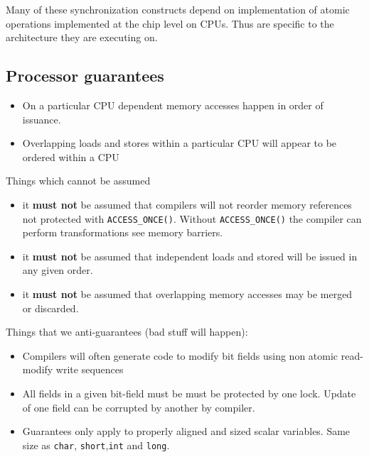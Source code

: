 \documentclass{article}
\begin{document}
Many of these synchronization constructs depend on implementation of
atomic operations implemented at the chip level on CPUs. Thus are
specific to the architecture they are executing on.

\subsection{Processor guarantees}

\begin{itemize}
  \item On a particular CPU dependent memory accesses happen in order
    of issuance.

  \item Overlapping loads and stores within a particular CPU will
    appear to be ordered within a CPU
    
\end{itemize}

Things which cannot be assumed

\begin{itemize}
\item it \textbf{must not} be assumed that compilers will not reorder
  memory references not protected with \lstinline{ACCESS_ONCE()}. Without
  \lstinline{ACCESS_ONCE()} the compiler can perform transformations see memory
  barriers.
\item it \textbf{must not} be assumed that independent loads and
  stored will be issued in any given order.
\item it \textbf{must not} be assumed that overlapping memory accesses
  may be merged or discarded.  
\end{itemize}

Things that we anti-guarantees (bad stuff will happen):

\begin{itemize}

\item Compilers will often generate code to modify bit fields using non
  atomic read-modify write sequences

\item All fields in a given bit-field must be must be protected by one
  lock. Update of one field can be corrupted by another by compiler.
  
\item Guarantees only apply to properly aligned and sized scalar
  variables. Same size as \lstinline{char},
  \lstinline{short},\lstinline{int} and \lstinline{long}.
  
\end{itemize}
\end{document}
